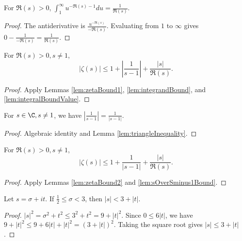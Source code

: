 \begin{lemma}\label{lem:integralBoundValue}
\leanok
For $\Re(s)>0$, $\int_1^\infty u^{-\Re(s)-1} du = \frac{1}{\Re(s)}$.
\end{lemma}
\begin{proof}
\leanok
The antiderivative is $\frac{u^{-\Re(s)}}{-\Re(s)}$. Evaluating from $1$ to $\infty$ gives $0 - \frac{1}{-\Re(s)} = \frac{1}{\Re(s)}$.
\end{proof}

\begin{lemma}\label{lem:zetaBound2}
\leanok
For $\Re(s)>0, s\neq 1$,
\[ |\zeta(s)| \le 1+\left|\frac{1}{s-1}\right| + \frac{|s|}{\Re(s)}. \]
\end{lemma}
\begin{proof}
\leanok
{}
Apply Lemmas \ref{lem:zetaBound1}, \ref{lem:integrandBound}, and \ref{lem:integralBoundValue}.
\end{proof}

\begin{lemma}\label{lem:sOverSminus1Bound}
\leanok
For $s\in\C, s\neq 1$, we have $\left|\frac{1}{s-1}\right| =\frac{1}{|s-1|}$.
\end{lemma}
\begin{proof}
\leanok
{}
Algebraic identity and Lemma \ref{lem:triangleInequality}.
\end{proof}

\begin{lemma}\label{lem:zetaBound3}
\leanok
For $\Re(s)>0, s\neq 1$,
\[ |\zeta(s)| \le 1 + \frac{1}{|s-1|} + \frac{|s|}{\Re(s)}. \]
\end{lemma}
\begin{proof}
\leanok
{}
Apply Lemmas \ref{lem:zetaBound2} and \ref{lem:sOverSminus1Bound}.
\end{proof}

\begin{lemma}[s bound]\label{lem:sBound}
\leanok
Let $s=\sigma+it$. If $\tfrac{1}{2} \le \sigma < 3$, then $|s| < 3+|t|$.
\end{lemma}
\begin{proof}
\leanok
$|s|^2 = \sigma^2+t^2 \le 3^2+t^2 = 9+|t|^2$. Since $0 \le 6|t|$, we have $9+|t|^2 \le 9+6|t|+|t|^2 = (3+|t|)^2$. Taking the square root gives $|s| \le 3+|t|$.
\end{proof}

